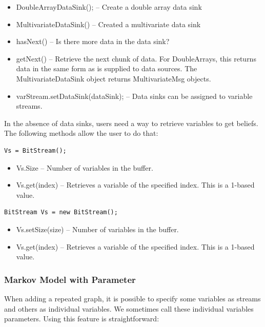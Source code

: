 \ifjava
\begin{itemize}
\item DoubleArrayDataSink(); -- Create a double array data sink
\item MultivariateDataSink() -- Created a multivariate data sink
\item hasNext() -- Is there more data in the data sink?
\item getNext() -- Retrieve the next chunk of data.  For DoubleArrays, this returns data in the same form as is supplied to data sources.  The MultivariateDataSink object returns MultivariateMsg objects.
\item varStream.setDataSink(dataSink); -- Data sinks can be assigned to variable streams.
\end{itemize}
\fi

In the absence of data sinks, users need a way to retrieve variables to get beliefs.   The following methods allow the user to do that:

\ifmatlab
\begin{lstlisting}
Vs = BitStream();
\end{lstlisting}

\begin{itemize}
\item Vs.Size -- Number of variables in the buffer.
\item Vs.get(index) -- Retrieves a variable of the specified index.  This is a 1-based value.
\end{itemize}
\fi

\ifjava
\begin{lstlisting}
BitStream Vs = new BitStream();
\end{lstlisting}

\begin{itemize}
\item Vs.setSize(size) -- Number of variables in the buffer.
\item Vs.get(index) -- Retrieves a variable of the specified index.  This is a 1-based value.
\end{itemize}

\fi

\subsubsection{Markov Model with Parameter}


When adding a repeated graph, it is possible to specify some variables as streams and others as individual variables.  We sometimes call these individual variables parameters.  Using this feature is straightforward:

